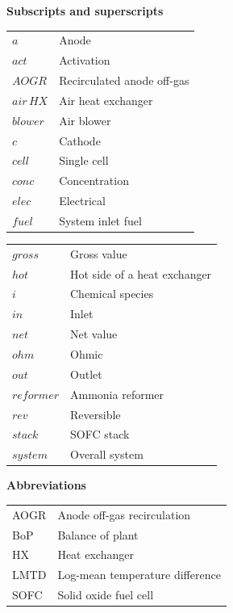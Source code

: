\documentclass[a4paper,10pt]{cas-dc} %
\begin{document}
\vspace{0.6em}
\noindent\textbf{Subscripts and superscripts}\\[2pt]
\noindent\begin{tabular}{@{}
  >{\raggedright\arraybackslash}p{}
  >{\raggedright\arraybackslash}p{}@{}}
\(a\) & Anode \\
\(act\) & Activation \\
\(AOGR\) & Recirculated anode off-gas \\
\(air\,HX\) & Air heat exchanger \\
\(blower\) & Air blower \\
\(c\) & Cathode \\
\(cell\) & Single cell \\
\(conc\) & Concentration \\
\(elec\) & Electrical \\
\(fuel\) & System inlet fuel \\
\end{tabular}

\noindent\begin{tabular}{@{}
  >{\raggedright\arraybackslash}p{}
  >{\raggedright\arraybackslash}p{}@{}}
\(gross\) & Gross value \\
\(hot\) & Hot side of a heat exchanger \\
\(i\) & Chemical species \\
\(in\) & Inlet \\
\(net\) & Net value \\
\(ohm\) & Ohmic \\
\(out\) & Outlet \\
\(reformer\) & Ammonia reformer \\
\(rev\) & Reversible \\
\(stack\) & SOFC stack \\
\(system\) & Overall system \\
\end{tabular}

\vspace{0.6em}
\noindent\textbf{Abbreviations}\\[2pt]
\noindent\begin{tabular}{@{}
  >{\raggedright\arraybackslash}p{}
  >{\raggedright\arraybackslash}p{}@{}}
AOGR & Anode off-gas recirculation \\
BoP & Balance of plant \\
HX & Heat exchanger \\
LMTD & Log-mean temperature difference \\
SOFC & Solid oxide fuel cell \\
\end{tabular}

\normalsize



\end{document}
